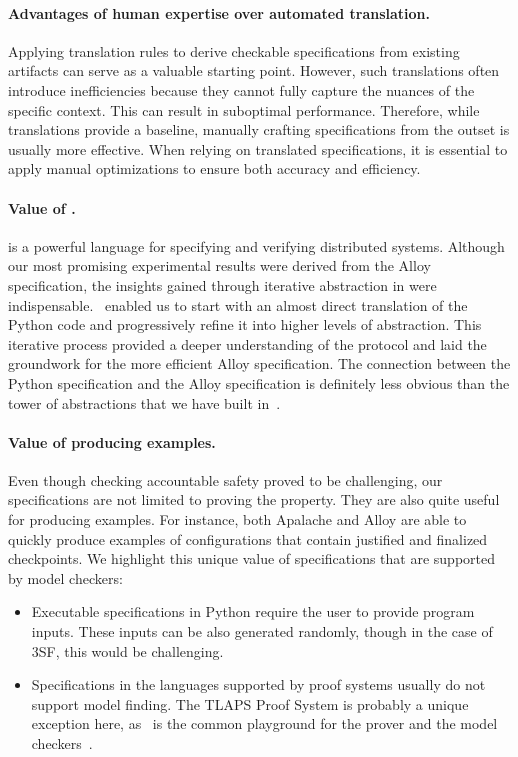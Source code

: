 \paragraph{Advantages of human expertise over automated translation.} Applying
translation rules to derive checkable specifications from existing artifacts can
serve as a valuable starting point. However, such translations often introduce
inefficiencies because they cannot fully capture the nuances of the specific
context. This can result in suboptimal performance. Therefore, while
translations provide a baseline, manually crafting specifications from the
outset is usually more effective. When relying on translated specifications, it is
essential to apply manual optimizations to ensure both accuracy and efficiency.

\paragraph{Value of \tlap{}.} \tlap{} is a powerful language for specifying and
verifying distributed systems. Although our most promising experimental results
were derived from the Alloy specification, the insights gained through
iterative abstraction in \tlap{} were indispensable.\ \tlap{} enabled us to
start with an almost direct translation of the Python code and progressively
refine it into higher levels of abstraction. This iterative process provided a
deeper understanding of the protocol and laid the groundwork for the more
efficient Alloy specification. The connection between the Python specification
and the Alloy specification is definitely less obvious than the tower of
abstractions that we have built in~\tlap{}.

\paragraph{Value of producing examples.} Even though checking accountable
safety proved to be challenging, our specifications are not limited to proving
the property. They are also quite useful for producing examples. For
instance, both Apalache and Alloy are able to quickly produce examples of
configurations that contain justified and finalized checkpoints. We highlight
this unique value of specifications that are supported by model checkers:

\begin{itemize}

  \item Executable specifications in Python require the user to provide program
    inputs. These inputs can be also generated randomly, though in the case of
    3SF, this would be challenging.

  \item Specifications in the languages supported by proof systems usually do
    not support model finding. The TLAPS Proof System is probably a unique
    exception here, as~\tlap{} is the common playground for the prover and the
    model checkers~\cite{KonnovKM22}.

\end{itemize}

